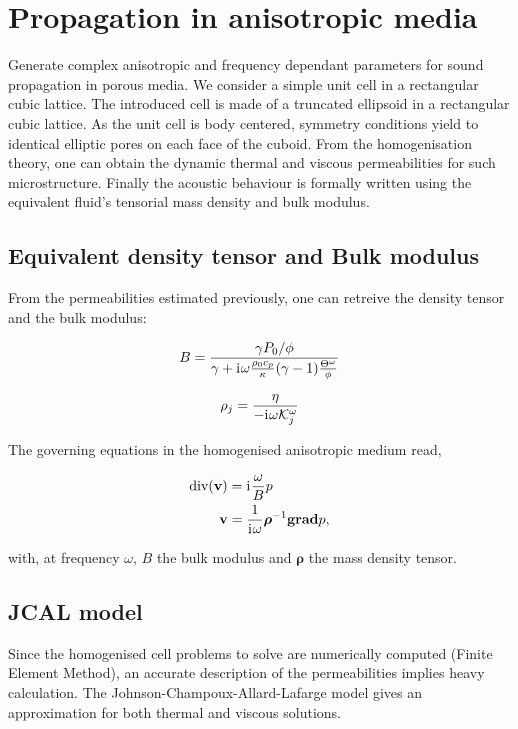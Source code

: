 \documentclass[a4paper,french,11pt]{article}
\newcommand{\dive}{\text{div}}
\newcommand{\grad}{\textbf{grad}}
\newcommand{\vect}{\mathbf}
\newcommand{\tens}{\bm}
\newcommand{\ii}{\mathrm{i}\mkern1mu}
\begin{document}
\section{Propagation in anisotropic media}

Generate complex anisotropic and frequency dependant parameters for sound propagation in porous media. We consider a simple unit cell in a rectangular cubic lattice.
The introduced cell is made of a truncated ellipsoid in a rectangular cubic lattice. As the unit cell is body centered, symmetry conditions yield to identical elliptic pores on each face of the cuboid. From the homogenisation theory, one can obtain the dynamic thermal and viscous permeabilities for such microstructure. Finally the acoustic behaviour is formally written using the equivalent fluid's tensorial mass density and bulk modulus.

\subsection{Equivalent density tensor and Bulk modulus}

From the permeabilities estimated previously, one can retreive the density tensor and the bulk modulus:

\begin{equation}
B = \frac{\gamma P_0/\phi}{\gamma + \ii \omega \frac{\rho_0 c_p}{\kappa}(\gamma -1)\frac{\Theta^\omega}{\phi}}
\end{equation}

\begin{equation}
\rho_j = \frac{\eta}{-\ii \omega \mathcal{K}^\omega_j}
\end{equation}


The governing equations in the homogenised anisotropic medium read,

\begin{align}
\dive (\vect{v}) &= \ii\frac{\omega}{B}p\\
\vect{v} &= \frac{1}{\ii \omega}\tens{\rho}^{-1}\grad p,
\end{align}

with, at frequency $\omega$, $B$ the bulk modulus and $\tens{\rho}$ the mass density tensor.

\subsection{JCAL model}

Since the homogenised cell problems to solve are numerically computed (Finite Element Method), an accurate description of the permeabilities implies heavy calculation. The Johnson-Champoux-Allard-Lafarge model gives an approximation for both thermal and viscous solutions.
\end{document}
